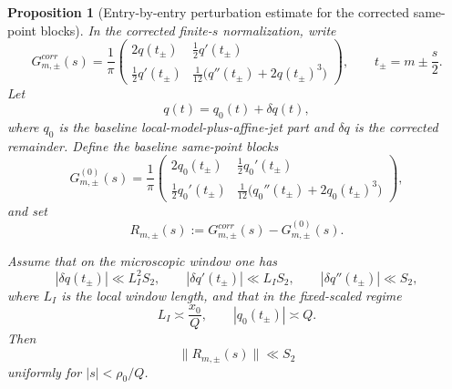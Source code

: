 \documentclass[11pt,a4paper]{amsart}
\def\corr{corr}%
\theoremstyle{plain}
\newtheorem{proposition}[theorem]{Proposition}
\theoremstyle{definition}
\newcommand{\corr}{\mathrm{corr}}
\begin{document}
\begin{proposition}[Entry-by-entry perturbation estimate for the corrected same-point blocks]
\label{prop:block-perturbation}
In the corrected finite-$s$ normalization, write
\[
G_{m,\pm}^{\corr}(s)
=
\frac1\pi
\begin{pmatrix}
2q(t_\pm) & \frac12 q'(t_\pm)\\[1ex]
\frac12 q'(t_\pm) & \frac1{12}\bigl(q''(t_\pm)+2q(t_\pm)^3\bigr)
\end{pmatrix},
\qquad
t_\pm=m\pm \frac{s}{2}.
\]
Let
\[
q(t)=q_0(t)+\delta q(t),
\]
where $q_0$ is the baseline local-model-plus-affine-jet part and $\delta q$ is the corrected remainder.
Define the baseline same-point blocks
\[
G_{m,\pm}^{(0)}(s)
=
\frac1\pi
\begin{pmatrix}
2q_0(t_\pm) & \frac12 q_0'(t_\pm)\\[1ex]
\frac12 q_0'(t_\pm) & \frac1{12}\bigl(q_0''(t_\pm)+2q_0(t_\pm)^3\bigr)
\end{pmatrix},
\]
and set
\[
R_{m,\pm}(s):=G_{m,\pm}^{\corr}(s)-G_{m,\pm}^{(0)}(s).
\]

Assume that on the microscopic window one has
\[
|\delta q(t_\pm)|\ll L_I^2 S_2,
\qquad
|\delta q'(t_\pm)|\ll L_I S_2,
\qquad
|\delta q''(t_\pm)|\ll S_2,
\]
where $L_I$ is the local window length, and that in the fixed-scaled regime
\[
L_I\asymp \frac{x_0}{Q},
\qquad
|q_0(t_\pm)|\asymp Q.
\]
Then
\[
\boxed{
\|R_{m,\pm}(s)\|\ll S_2
}
\]
uniformly for $|s|<\rho_0/Q$.
\end{proposition}
\end{document}
